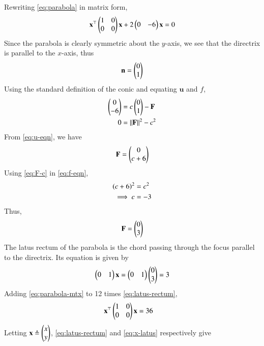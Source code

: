 \documentclass[journal,12pt,twocolumn]{IEEEtran}
\renewcommand{\vec}[1]{\boldsymbol{\mathbf{#1}}}
\begin{document}
\begin{enumerate}
    \solution Rewriting \eqref{eq:parabola} in matrix form,
    \begin{align}
        \vec{x}^\top\myvec{1&0\\0&0}\vec{x} + 2\myvec{0&-6}\vec{x} = 0
        \label{eq:parabola-mtx}
    \end{align}
    Since the parabola is clearly symmetric about the $y$-axis, we see that
    the directrix is parallel to the $x$-axis, thus
    \begin{align}
        \vec{n} = \myvec{0\\1}
        \label{eq:n}
    \end{align}
    Using the standard definition of the conic and equating $\vec{u}$ and $f$,
    \begin{align}
        \myvec{0\\-6} &= c\myvec{0\\1} - \vec{F} \label{eq:u-eqn} \\
        0 &= \norm{\vec{F}}^2 - c^2 \label{eq:f-eqn}
    \end{align}
    From \eqref{eq:u-eqn}, we have
    \begin{align}
        \vec{F} = \myvec{0\\c+6}
        \label{eq:F-c}
    \end{align}
    Using \eqref{eq:F-c} in \eqref{eq:f-eqn},
    \begin{align}
        \left(c+6\right)^2&=c^2 \\
        \implies c&=-3
        \label{eq:c-sol}
    \end{align}
    Thus,
    \begin{align}
        \vec{F} = \myvec{0\\3}
    \end{align}
    The latus rectum of the parabola is the chord passing through the focus 
    parallel to the directrix. Its equation is given by
    \begin{align}
        \myvec{0&1}\vec{x} = \myvec{0&1}\myvec{0\\3} = 3
        \label{eq:latus-rectum}
    \end{align}
    Adding \eqref{eq:parabola-mtx} to 12 times \eqref{eq:latus-rectum},
    \begin{align}
        \vec{x}^\top\myvec{1&0\\0&0}\vec{x} &= 36
        \label{eq:x-latus}
    \end{align}
    Letting $\vec{x} \triangleq \myvec{x\\y}$, \eqref{eq:latus-rectum} and
    \eqref{eq:x-latus} respectively give

\end{enumerate}
\end{document}
